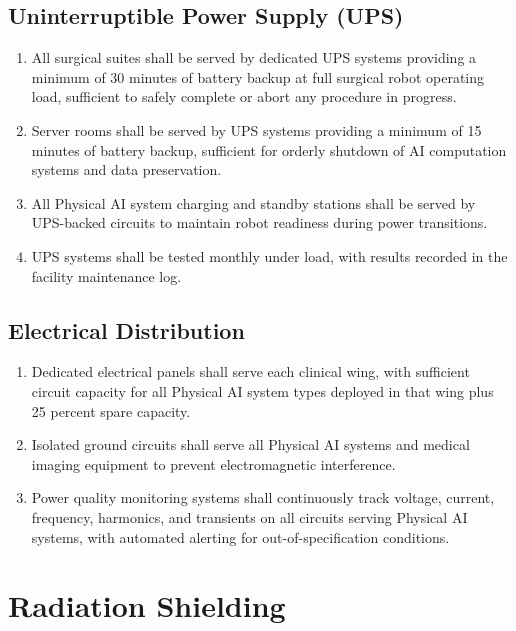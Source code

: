 \subsection{Uninterruptible Power Supply (UPS)}

\begin{enumerate}[label=(\alph*)]
\item All surgical suites shall be served by dedicated UPS systems providing a
  minimum of 30 minutes of battery backup at full surgical robot operating
  load, sufficient to safely complete or abort any procedure in progress.

\item Server rooms shall be served by UPS systems providing a minimum of 15
  minutes of battery backup, sufficient for orderly shutdown of AI computation
  systems and data preservation.

\item All Physical AI system charging and standby stations shall be served by
  UPS-backed circuits to maintain robot readiness during power transitions.

\item UPS systems shall be tested monthly under load, with results recorded
  in the facility maintenance log.
\end{enumerate}

\subsection{Electrical Distribution}

\begin{enumerate}[label=(\alph*)]
\item Dedicated electrical panels shall serve each clinical wing, with
  sufficient circuit capacity for all Physical AI system types deployed in
  that wing plus 25 percent spare capacity.

\item Isolated ground circuits shall serve all Physical AI systems and medical
  imaging equipment to prevent electromagnetic interference.

\item Power quality monitoring systems shall continuously track voltage, current,
  frequency, harmonics, and transients on all circuits serving Physical AI
  systems, with automated alerting for out-of-specification conditions.
\end{enumerate}

\section{Radiation Shielding}

